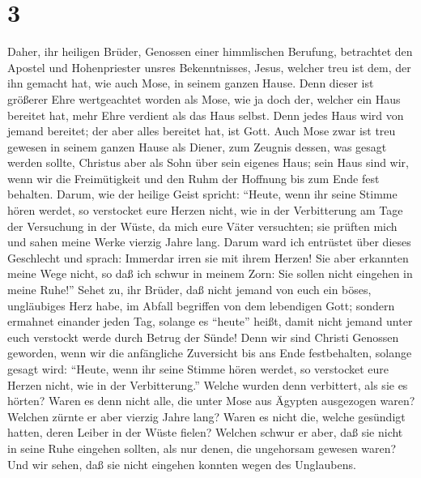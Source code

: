 \hypertarget{section-2}{%
\section{3}\label{section-2}}

 Daher, ihr heiligen Brüder, Genossen einer himmlischen
Berufung, betrachtet den Apostel und Hohenpriester unsres Bekenntnisses,
Jesus,  welcher treu ist dem, der ihn gemacht hat, wie
auch Mose, in seinem ganzen Hause.  Denn dieser ist
größerer Ehre wertgeachtet worden als Mose, wie ja doch der, welcher ein
Haus bereitet hat, mehr Ehre verdient als das Haus selbst.
 Denn jedes Haus wird von jemand bereitet; der aber alles
bereitet hat, ist Gott.  Auch Mose zwar ist treu gewesen
in seinem ganzen Hause als Diener, zum Zeugnis dessen, was gesagt werden
sollte,  Christus aber als Sohn über sein eigenes Haus;
sein Haus sind wir, wenn wir die Freimütigkeit und den Ruhm der Hoffnung
bis zum Ende fest behalten.  Darum, wie der heilige Geist
spricht: ``Heute, wenn ihr seine Stimme hören werdet, so verstocket eure
Herzen nicht,  wie in der Verbitterung am Tage der
Versuchung in der Wüste, da mich eure Väter versuchten; 
sie prüften mich und sahen meine Werke vierzig Jahre lang.
 Darum ward ich entrüstet über dieses Geschlecht und
sprach: Immerdar irren sie mit ihrem Herzen!  Sie aber
erkannten meine Wege nicht, so daß ich schwur in meinem Zorn: Sie sollen
nicht eingehen in meine Ruhe!''  Sehet zu, ihr Brüder,
daß nicht jemand von euch ein böses, ungläubiges Herz habe, im Abfall
begriffen von dem lebendigen Gott;  sondern ermahnet
einander jeden Tag, solange es ``heute'' heißt, damit nicht jemand unter
euch verstockt werde durch Betrug der Sünde!  Denn wir
sind Christi Genossen geworden, wenn wir die anfängliche Zuversicht bis
ans Ende festbehalten,  solange gesagt wird: ``Heute,
wenn ihr seine Stimme hören werdet, so verstocket eure Herzen nicht, wie
in der Verbitterung.''  Welche wurden denn verbittert,
als sie es hörten? Waren es denn nicht alle, die unter Mose aus Ägypten
ausgezogen waren?  Welchen zürnte er aber vierzig Jahre
lang? Waren es nicht die, welche gesündigt hatten, deren Leiber in der
Wüste fielen?  Welchen schwur er aber, daß sie nicht in
seine Ruhe eingehen sollten, als nur denen, die ungehorsam gewesen
waren?  Und wir sehen, daß sie nicht eingehen konnten
wegen des Unglaubens.

